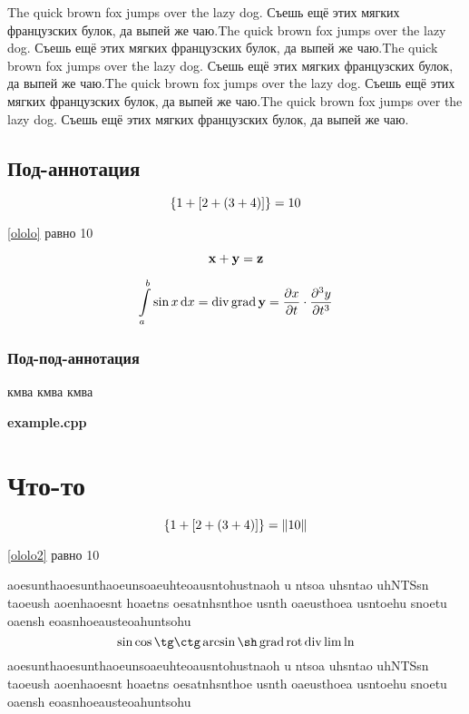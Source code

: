 \documentclass{diploma}
\begin{document}
\textsf{The quick brown fox jumps over the lazy dog. Съешь ещё этих мягких французских булок, да выпей же чаю.The quick brown fox jumps over the lazy dog. Съешь ещё этих мягких французских булок, да выпей же чаю.The quick brown fox jumps over the lazy dog. Съешь ещё этих мягких французских булок, да выпей же чаю.The quick brown fox jumps over the lazy dog. Съешь ещё этих мягких французских булок, да выпей же чаю.The quick brown fox jumps over the lazy dog. Съешь ещё этих мягких французских булок, да выпей же чаю.}

\section{Под-аннотация}

\begin{equation}\label{ololo}
\left\{1 + \left[2 + \left(3 + 4\right)\right]\right\} = 10
\end{equation}

\conclusion \eqref{ololo} равно 10

$$
\mathrm{\mathbf{x}} + \mathrm{\mathbf{y}} = \mathrm{\mathbf{z}}
$$

$$
\int\limits_{a}^{b} \sin x \operatorname{d}\!x = \operatorname{div} \operatorname{grad} \mathrm{\mathbf{y}} = \frac{\partial x}{\partial t} \cdot \frac{\partial^{3} y}{\partial t^{3}}
$$

\subsection{Под-под-аннотация}

кмва
кмва
кмва

\textbf{example.cpp}\\


\chapter{Что-то}

\begin{equation}\label{ololo2}
\left\{1 + \left[2 + \left(3 + 4\right)\right]\right\} = \left\|{10}\right\|
\end{equation}

\conclusion \ref{ololo2} равно 10

aoesunthaoesunthaoeunsoaeuhteoausntohustnaoh
u ntsoa uhsntao uhNTSsn taoeush aoenhaoesnt hoaetns oesatnhsnthoe usnth oaeusthoea usntoehu snoetu oaensh eoasnhoeausteoahuntsohu
\begin{equation}
\sin \cos \tg \ctg \arcsin \sh \rugrad \rurot \rudiv \lim \ln
\end{equation}
aoesunthaoesunthaoeunsoaeuhteoausntohustnaoh
u ntsoa uhsntao uhNTSsn taoeush aoenhaoesnt hoaetns oesatnhsnthoe usnth oaeusthoea usntoehu snoetu oaensh eoasnhoeausteoahuntsohu
\end{document}
